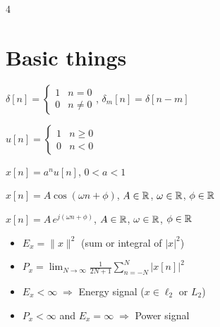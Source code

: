 \documentclass[8pt,a4paper,landscape]{extarticle}
\begin{document}
\begin{multicols*}{4}



\section{Basic things}
\begin{defn}[title=Unit impulse | Delta]
$\delta[n] = \begin{cases}1 & n=0\\0 & n\ne 0\end{cases}$, \quad $\delta_m[n] = \delta[n-m]$
\end{defn}

\begin{defn}[title=Unit step]
$u[n] = \begin{cases}1 & n\ge 0\\0 & n<0\end{cases}$
\end{defn}

\begin{defn}[title=Exponential decay]
$x[n] = a^n u[n]$, \quad $0 < a < 1$
\end{defn}

\begin{defn}[title=Sinusoidal oscillation]
$x[n] = A \cos(\omega n + \phi)$, \quad $A\in\mathbb{R}$, $\omega\in\mathbb{R}$, $\phi\in\mathbb{R}$
\end{defn}

\begin{defn}[title=Complex exponential]
$x[n] = A\,e^{j(\omega n + \phi)}$, \quad $A\in\mathbb{R}$, $\omega\in\mathbb{R}$, $\phi\in\mathbb{R}$
\end{defn}

\begin{thm}[title=Energy and Power]
\begin{itemize}
  \item $E_x = \|x\|^2$ \quad (sum or integral of $|x|^2$)
  \item $P_x = \lim_{N\to\infty}\frac{1}{2N+1}\sum_{n=-N}^{N}|x[n]|^2$
  \item $E_x < \infty \;\Rightarrow$ Energy signal ($x \in \ell_2$ or $L_2$)
  \item $P_x < \infty$ and $E_x = \infty \;\Rightarrow$ Power signal
\end{itemize}
\end{thm}


\end{multicols*}
\end{document}
